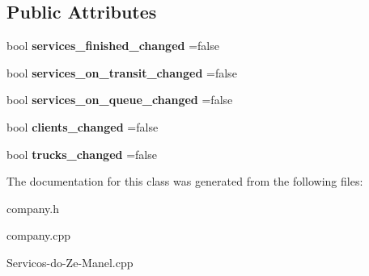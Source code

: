 \subsection*{Public Attributes}
\begin{DoxyCompactItemize}
\item 
\mbox{\label{class_company_a0671d8c8afcbe73e5719eac7db205859}} 
bool {\bfseries services\+\_\+finished\+\_\+changed} =false
\item 
\mbox{\label{class_company_aeac99d209136e732106bc0a3dad7d5d1}} 
bool {\bfseries services\+\_\+on\+\_\+transit\+\_\+changed} =false
\item 
\mbox{\label{class_company_a7f986eaf19517385d257ecf74a1a970a}} 
bool {\bfseries services\+\_\+on\+\_\+queue\+\_\+changed} =false
\item 
\mbox{\label{class_company_ab565013c5770e9ac94cc7f2875917f45}} 
bool {\bfseries clients\+\_\+changed} =false
\item 
\mbox{\label{class_company_ae9ee930a4a92e6f048960e486d2783dd}} 
bool {\bfseries trucks\+\_\+changed} =false
\end{DoxyCompactItemize}


The documentation for this class was generated from the following files\+:\begin{DoxyCompactItemize}
\item 
company.\+h\item 
company.\+cpp\item 
Servicos-\/do-\/\+Ze-\/\+Manel.\+cpp\end{DoxyCompactItemize}
